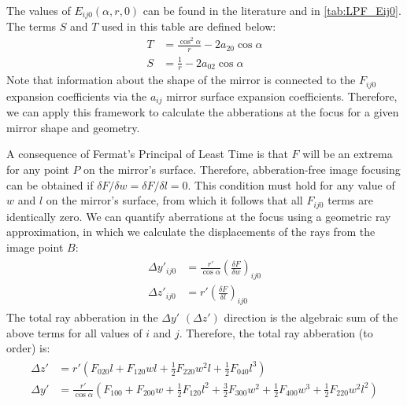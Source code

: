 The values of $E_{ij0}(\alpha, r, 0)$ can be found in the literature and in \cref{tab:LPF_Eij0}. The terms $S$ and $T$ used in this table are defined below:
\begin{align}
T &= \frac{\cos^2 \alpha}{r} - 2 a_{20} \cos \alpha \\
S &= \frac{1}{r} - 2 a_{02} \cos \alpha
\end{align}
Note that information about the shape of the mirror is connected to the $F_{ij0}$ expansion coefficients via the $a_{ij}$ mirror surface expansion coefficients. Therefore, we can apply this framework to calculate the abberations at the focus for a given mirror shape and geometry.

A consequence of Fermat's Principal of Least Time is that $F$ will be an extrema for any point $P$ on the mirror's surface. Therefore, abberation-free image focusing can be obtained if $\delta F/\delta w = \delta F / \delta l = 0$. This condition must hold for any value of $w$ and $l$ on the mirror's surface, from which it follows that all $F_{ij0}$ terms are identically zero. We can quantify aberrations at the focus using a geometric ray approximation, in which we calculate the displacements of the rays from the image point $B$:
\begin{gather}
\begin{aligned}
\Delta y'_{ij0} &= \frac{r'}{\cos \alpha} \left( \frac{\delta F}{\delta w} \right)_{ij0} \\
\Delta z'_{ij0} &= r' \left( \frac{\delta F}{\delta l} \right)_{ij0}
\end{aligned}
\end{gather}
The total ray abberation in the $\Delta y'$ $(\Delta z')$ direction is the algebraic sum of the above terms for all values of $i$ and $j$. Therefore, the total ray abberation (to  order) is:
\begin{gather}
\begin{aligned}
\Delta z' &= r' \left( F_{020} l + F_{120} w l + \frac{1}{2} F_{220} w^2 l + \frac{1}{2} F_{040} l^3 \right) \\
\Delta y' &= \frac{r'}{\cos \alpha} \left( F_{100} + F_{200} w + \frac{1}{2} F_{120} l^2 + \frac{3}{2} F_{300} w^2  + \frac{1}{2} F_{400} w^3 + \frac{1}{2} F_{220} w^2 l^2 \right)
\end{aligned}
\label{eqn:abberation_expansion}
\end{gather}

